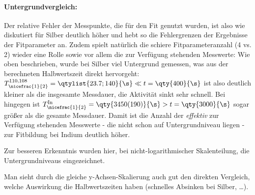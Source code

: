\paragraph{Untergrundvergleich:} Der relative Fehler der Messpunkte, die für den Fit genutzt wurden, ist also wie diskutiert für Silber deutlich höher und hebt so die Fehlergrenzen der Ergebnisse der Fitparameter an. Zudem spielt natürlich die schiere Fitparameteranzahl (4 vs. 2) wieder eine Rolle sowie vor allem die zur Verfügung stehenden Messwerte: Wie oben beschrieben, wurde bei Silber viel Untergrund gemessen, was aus der berechneten Halbwertszeit direkt hervorgeht: \(T^{\text{110,108}}_{\nicefrac{1}{2}}=\qtylist{23.7;140}{\s}\ll t=\qty{400}{\s}\) ist also deutlich kleiner als die insgesamte Messdauer, die Aktivität sinkt sehr schnell. Bei  hingegen ist \(T^{\text{In}}_{\nicefrac{1}{2}}=\qty{3450(190)}{\s}> t=\qty{3000}{\s}\) sogar größer als die gesamte Messdauer. Damit ist die Anzahl der \emph{effektiv} zur Verfügung stehenden Messwerte - die nicht schon auf Untergrundniveau liegen - zur Fitbildung bei Indium deutlich höher. 

Zur besseren Erkenntnis wurden hier, bei nicht-logarithmischer Skalenteilung, die Untergrundniveaus eingezeichnet.


Man sieht durch die gleiche y-Achsen-Skalierung auch gut den direkten Vergleich, welche Auswirkung die Halbwertszeiten haben (schnelles Absinken bei Silber, \dots).

